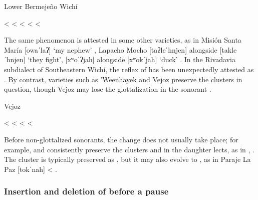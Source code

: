 \ea
Lower Bermejeño Wichí \citep{VN14,JB09} \label{wi-lb-obgl}\\
    \begin{xlist}
        \ex {} < 
        \ex {} < 
        \ex {} < 
        \ex {} < 
        \ex {} < 
    \end{xlist}
\z
{}

The same phenomenon is attested in some other varieties, as in Misión Santa María [owaˈlaʔ] `my nephew' \citep{SS07}, Lapacho Mocho \mbox{[taʔleˈhnjen]} alongside \mbox{[takleˈhnjen]} `they fight', [xʷoˈʔjah] alongside [xʷokˈjah] `duck' \citep[163–164, 167]{AFG-SS-09}. In the Rivadavia subdialect of Southeastern Wichí, the reflex of  has been unexpectedly attested as  \citep[134]{MC09}. By contrast, varieties such as ’Weenhayek and Vejoz preserve the clusters in question, though Vejoz may lose the glottalization in the sonorant .

\ea
Vejoz \citep{RJH13a,VU74,MG-MELO15} \label{wi-vj-obgl}\\
    \begin{xlist}
        \ex {} < 
        \ex {} < 
        \ex {} < 
        \ex {} < 
    \end{xlist}
\z
{}

Before non-glottalized sonorants, the change does not usually take place; for example,  and  consistently preserve the clusters  and  in the daughter lects, as in ,  \citep[97]{VN14}. The cluster  is typically preserved as , but it may also evolve to , as in Paraje La Paz [tokˈnah] < .

\subsubsection{Insertion and deletion of  before a pause}

